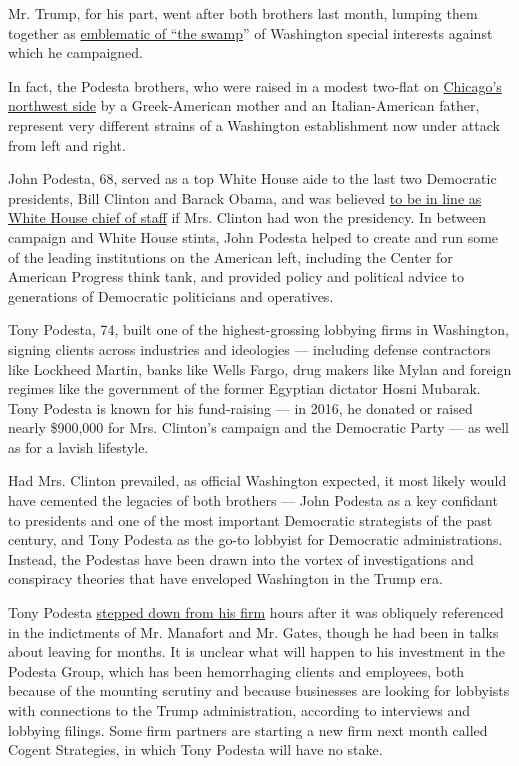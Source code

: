 Mr. Trump, for his part, went after both brothers last month, lumping
them together as
\href{https://twitter.com/realDonaldTrump/status/925364408364171265}{emblematic
of ``the swamp}'' of Washington special interests against which he
campaigned.

In fact, the Podesta brothers, who were raised in a modest two-flat on
\href{http://www.chicagomag.com/Chicago-Magazine/Felsenthal-Files/December-2013/How-the-Podesta-Brothers-Rose-From-the-39th-Ward-to-the-White-House/}{Chicago's
northwest side} by a Greek-American mother and an Italian-American
father, represent very different strains of a Washington establishment
now under attack from left and right.

John Podesta, 68, served as a top White House aide to the last two
Democratic presidents, Bill Clinton and Barack Obama, and was believed
\href{https://www.politico.com/story/2016/10/podesta-tops-clintons-short-list-for-chief-of-staff-230366}{to
be in line as White House chief of staff} if Mrs. Clinton had won the
presidency. In between campaign and White House stints, John Podesta
helped to create and run some of the leading institutions on the
American left, including the Center for American Progress think tank,
and provided policy and political advice to generations of Democratic
politicians and operatives.

Tony Podesta, 74, built one of the highest-grossing lobbying firms in
Washington, signing clients across industries and ideologies ---
including defense contractors like Lockheed Martin, banks like Wells
Fargo, drug makers like Mylan and foreign regimes like the government of
the former Egyptian dictator Hosni Mubarak. Tony Podesta is known for
his fund-raising --- in 2016, he donated or raised nearly \$900,000 for
Mrs. Clinton's campaign and the Democratic Party --- as well as for a
lavish lifestyle.

Had Mrs. Clinton prevailed, as official Washington expected, it most
likely would have cemented the legacies of both brothers --- John
Podesta as a key confidant to presidents and one of the most important
Democratic strategists of the past century, and Tony Podesta as the
go-to lobbyist for Democratic administrations. Instead, the Podestas
have been drawn into the vortex of investigations and conspiracy
theories that have enveloped Washington in the Trump era.

Tony Podesta
\href{https://www.nytimes.com/2017/10/30/us/politics/tony-podesta-resignation-lobbying.html?_r=0}{stepped
down from his firm} hours after it was obliquely referenced in the
indictments of Mr. Manafort and Mr. Gates, though he had been in talks
about leaving for months. It is unclear what will happen to his
investment in the Podesta Group, which has been hemorrhaging clients and
employees, both because of the mounting scrutiny and because businesses
are looking for lobbyists with connections to the Trump administration,
according to interviews and lobbying filings. Some firm partners are
starting a new firm next month called Cogent Strategies, in which Tony
Podesta will have no stake.

